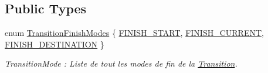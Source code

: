 \subsection*{Public Types}
\begin{DoxyCompactItemize}
\item 
enum \hyperlink{classns_transition_1_1_transition_a0bf761e331527477ce0c5e496b722a19}{Transition\+Finish\+Modes} \{ \hyperlink{classns_transition_1_1_transition_a0bf761e331527477ce0c5e496b722a19a87bacef756b461171816412a31e19ad4}{F\+I\+N\+I\+S\+H\+\_\+\+S\+T\+A\+RT}, 
\hyperlink{classns_transition_1_1_transition_a0bf761e331527477ce0c5e496b722a19a4d57dbd11ced739957f0609922a6dc9f}{F\+I\+N\+I\+S\+H\+\_\+\+C\+U\+R\+R\+E\+NT}, 
\hyperlink{classns_transition_1_1_transition_a0bf761e331527477ce0c5e496b722a19ad32a777c01bab232b51e5eeb31e2b03e}{F\+I\+N\+I\+S\+H\+\_\+\+D\+E\+S\+T\+I\+N\+A\+T\+I\+ON}
 \}\begin{DoxyCompactList}\small\item\em Transition\+Mode \+: Liste de tout les modes de fin de la \hyperlink{classns_transition_1_1_transition}{Transition}. \end{DoxyCompactList}
\end{DoxyCompactItemize}
